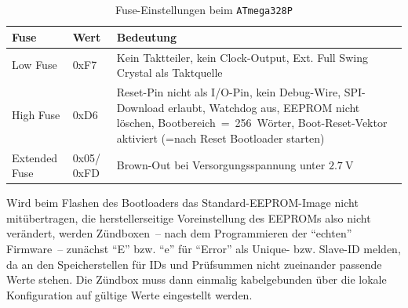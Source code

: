 \documentclass[paper=a4, parskip, numbers=noenddot, toc=listof, headsepline]{scrbook}
\begin{document}
			\begin{table}
				\centering
				\begin{tabu}
					to .9\textwidth {lX[1,l]X[-7,l]}
					\hline\hline
					\textbf{Fuse} & \textbf{Wert}           & \textbf{Bedeutung}                                                                                                                                                                             \\ \hline
					Low Fuse      & 0xF7                    & Kein Taktteiler, kein Clock-Output, Ext. Full Swing Crystal als Taktquelle                                                                                                                     \\
					High Fuse     & 0xD6                    & Reset-Pin nicht als I/O-Pin, kein Debug-Wire, SPI-Download erlaubt, Watchdog aus, EEPROM nicht löschen, Bootbereich~=~256~Wörter, Boot-Reset-Vektor aktiviert (=nach Reset Bootloader starten) \\
					Extended Fuse & 0x05/ 0xFD\footnotemark & Brown-Out bei Versorgungsspannung unter $\SI{2,7}{\volt}$                                                                                                                                      \\ \hline\hline
				\end{tabu}
				\caption{Fuse-Einstellungen beim \texttt{ATmega328P}}
				\label{tab:fuses}
			\end{table}

			Wird beim Flashen des Bootloaders das Standard-EEPROM-Image nicht mitübertragen, die herstellerseitige Voreinstellung des EEPROMs also nicht verändert, werden Zündboxen~-- nach dem Programmieren der \enquote{echten} Firmware~-- zunächst \enquote{E} bzw. \enquote{e} für \enquote{Error} als Unique- bzw. Slave-ID melden, da an den Speicherstellen für IDs und Prüfsummen nicht zueinander passende Werte stehen. Die Zündbox muss dann einmalig kabelgebunden über die lokale Konfiguration auf gültige Werte eingestellt werden.
			
\end{document}
